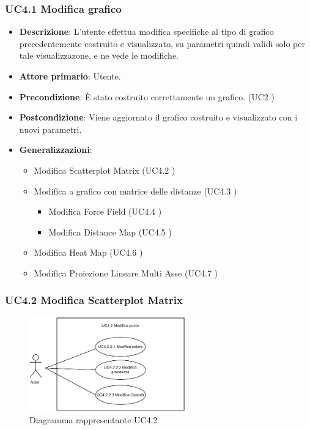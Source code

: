 \newpage
\subsubsection{UC4.1 Modifica grafico}
\label{ssub:uc4.1}

\begin{itemize}
    \item \textbf{Descrizione}: L’utente effettua modifica specifiche al tipo di grafico precedentemente costruito e visualizzato, 
                                su parametri quindi validi solo per tale visualizzazone, e ne vede le modifiche.
	
    \item \textbf{Attore primario}: Utente.
    
    \item \textbf{Precondizione}:   È stato costruito correttamente un grafico. (UC2 )

    \item \textbf{Postcondizione}:  Viene aggiornato il grafico costruito e visualizzato con i nuovi parametri.

    \item \textbf{Generalizzazioni}:
        \begin{itemize}
            \item Modifica Scatterplot Matrix (UC4.2 )
            \item Modifica a grafico con matrice delle distanze (UC4.3 )
            \begin{itemize}
                \item Modifica Force Field (UC4.4 )
                \item Modifica Distance Map (UC4.5 )
             \end{itemize}
            \item Modifica Heat Map (UC4.6 )
            \item Modifica Proiezione Lineare Multi Asse (UC4.7 )
        \end{itemize}
\end{itemize}

\subsubsection{UC4.2 Modifica Scatterplot Matrix}
\label{ssub:uc4.2}

\begin{figure}[h]
    \centering
    \includegraphics[width=0.6\textwidth]{componenti/casi-duso/diagrammi/UC4_2.pdf}
    \caption{Diagramma rappresentante UC4.2}
    \label{fig:UC4.2}
\end{figure}


